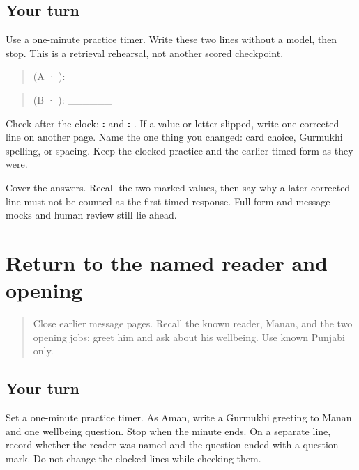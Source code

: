 \subsection*{Your turn}
Use a one-minute practice timer. Write these two lines without a model, then stop. This is a retrieval rehearsal, not another scored checkpoint.

\begin{quote}
 (A · ): \_\_\_\_\_\_
\end{quote}

\begin{quote}
 (B · ): \_\_\_\_\_\_
\end{quote}

Check after the clock: \textbf{: } and \textbf{: }. If a value or letter slipped, write one corrected line on another page. Name the one thing you changed: card choice, Gurmukhi spelling, or spacing. Keep the clocked practice and the earlier timed form as they were.

\begin{tcolorbox}[breakable,colback=teal!4,colframe=teal!35!black,title={Before you move on}]
Cover the answers. Recall the two marked values, then say why a later corrected line must not be counted as the first timed response. Full form-and-message mocks and human review still lie ahead.
\end{tcolorbox}
\section[(reader and opening)]{Return to the named reader and opening}

\label{lesson:PA-W13-message-opening-return}



\begin{quote}
Close earlier message pages. Recall the known reader, Manan, and the two opening jobs: greet him and ask about his wellbeing. Use known Punjabi only.
\end{quote}

\subsection*{Your turn}
Set a one-minute practice timer. As Aman, write a Gurmukhi greeting to Manan and one wellbeing question. Stop when the minute ends. On a separate line, record whether the reader was named and the question ended with a question mark. Do not change the clocked lines while checking them.


